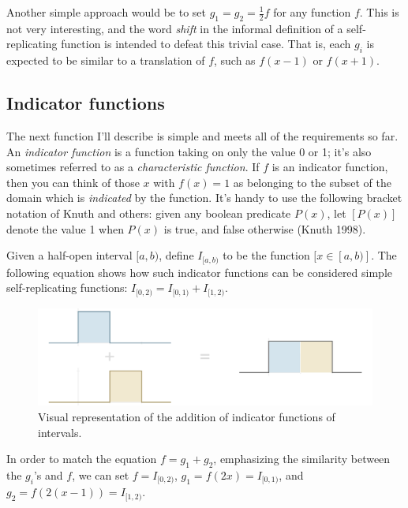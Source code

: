 \documentclass[]{article}
\begin{document}
Another simple approach would be to set \(g_1 = g_2 = \frac{1}{2}f\) for
any function \(f\). This is not very interesting, and the word
\emph{shift} in the informal definition of a self-replicating function
is intended to defeat this trivial case. That is, each \(g_i\) is
expected to be similar to a translation of \(f\), such as \(f(x-1)\) or
\(f(x+1)\).

\subsection{Indicator functions}\label{indicator-functions}

The next function I'll describe is simple and meets all of the
requirements so far. An \emph{indicator function} is a function taking
on only the value 0 or 1; it's also sometimes referred to as a
\emph{characteristic function}. If \(f\) is an indicator function, then
you can think of those \(x\) with \(f(x) = 1\) as belonging to the
subset of the domain which is \emph{indicated} by the function. It's
handy to use the following bracket notation of Knuth and others: given
any boolean predicate \(P(x)\), let \([P(x)]\) denote the value 1 when
\(P(x)\) is true, and false otherwise (Knuth 1998).

Given a half-open interval \([a, b)\), define \(I_{[a, b)}\) to be the
function \([x\in[a, b)]\). The following equation shows how such
indicator functions can be considered simple self-replicating functions:
\(I_{[0, 2)} = I_{[0, 1)} + I_{[1, 2)}\).

\begin{figure}[htbp]
\centering
\includegraphics{images/pdfs/added_intervals6.pdf}
\caption{\label{fig:added_intervals}Visual representation of the
addition of indicator functions of
intervals.}\label{fig:addedux5fintervals}
\end{figure}

In order to match the equation \(f = g_1 + g_2\), emphasizing the
similarity between the \(g_i\)'s and \(f\), we can set
\(f = I_{[0, 2)}\), \(g_1 = f(2x) = I_{[0, 1)}\), and
\(g_2 = f(2(x - 1)) = I_{[1, 2)}\).
\end{document}
